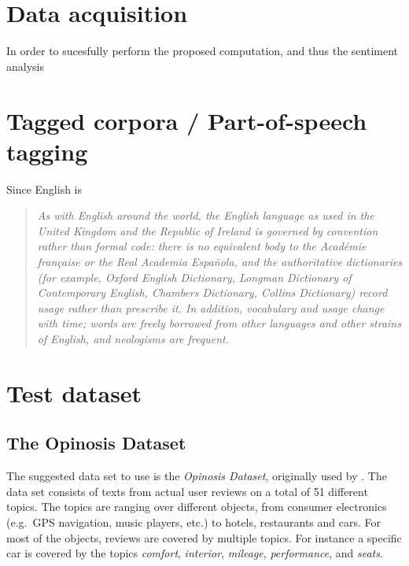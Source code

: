 \clearpage

\clearpage

\section{Data acquisition}
In order to sucesfully perform the proposed computation, and thus the sentiment analysis 

\section*{Tagged corpora / Part-of-speech tagging}

Since English is 



\begin{quote}
  \it As with English around the world, the English language as used in the United Kingdom and the Republic of Ireland is governed by convention rather than formal code: there is no equivalent body to the Académie française or the Real Academia Española, and the authoritative dictionaries (for example, Oxford English Dictionary, Longman Dictionary of Contemporary English, Chambers Dictionary, Collins Dictionary) record usage rather than prescribe it. In addition, vocabulary and usage change with time; words are freely borrowed from other languages and other strains of English, and neologisms are frequent.
\end{quote}
 
\section{Test dataset}

\subsection*{The Opinosis Dataset}
The suggested data set to use is the \emph{Opinosis Dataset}, originally used by \cite{Opinosis}. The data set consists of texts from actual user reviews on a total of 51 different topics. The topics are ranging over different objects, from consumer electronics (e.g.\ GPS navigation, music players, etc.) to hotels, restaurants and cars. For most of the objects, reviews are covered by multiple topics. For instance a specific car is covered by the topics \emph{comfort}, \emph{interior}, \emph{mileage}, \emph{performance}, and \emph{seats}.

